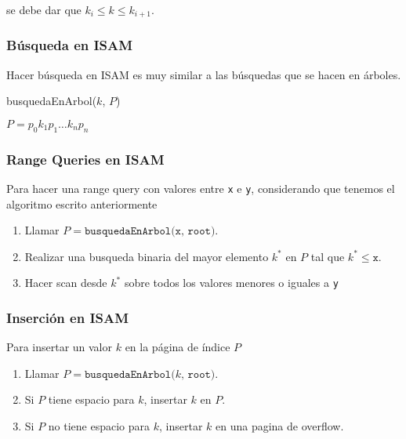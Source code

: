 se debe dar que $k_i \leq k \leq k_{i+1}$.

\subsubsection{Búsqueda en ISAM}
Hacer búsqueda en ISAM es muy similar a las búsquedas que se hacen en árboles.

\begin{algorithm}
  \caption{busquedaEnArbol($k$, $P$)}
  $P = p_0 k_1 p_1 \ldots k_n p_n$\;
  
\end{algorithm}

\subsubsection{Range Queries en ISAM}
Para hacer una range query con valores entre \texttt{x} e \texttt{y}, considerando que tenemos el algoritmo escrito anteriormente
\begin{enumerate}
  \item Llamar $P = \texttt{busquedaEnArbol(x, root)}$.
  \item Realizar una busqueda binaria del mayor elemento $k^*$ en $P$ tal que $k^* \leq \texttt{x}$.
  \item Hacer scan desde $k^*$ sobre todos los valores menores o iguales a \texttt{y}
\end{enumerate}

\subsubsection{Inserción en ISAM}
Para insertar un valor $k$ en la página de índice $P$
\begin{enumerate}
  \item Llamar $P = \texttt{busquedaEnArbol($k$, root)}$.
  \item Si $P$ tiene espacio para $k$, insertar $k$ en $P$.
  \item Si $P$ no tiene espacio para $k$, insertar $k$ en una pagina de overflow.
\end{enumerate}

